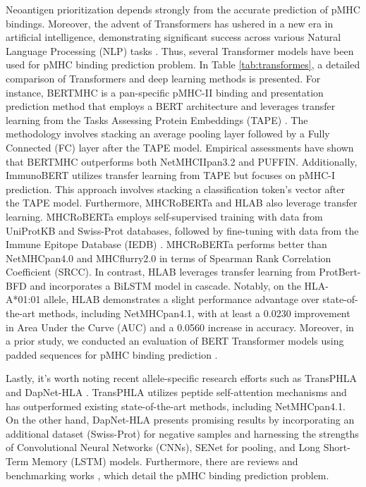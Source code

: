 Neoantigen prioritization depends strongly from the accurate prediction of pMHC bindings. Moreover, the advent of Transformers has ushered in a new era in artificial intelligence, demonstrating significant success across various Natural Language Processing (NLP) tasks \cite{patwardhan2023transformers}. Thus,  several Transformer models have been used for pMHC binding prediction problem. In Table \ref{tab:transformes}, a detailed comparison of Transformers and deep learning methods is presented.  For instance, BERTMHC \cite{cheng2021bertmhc} is a pan-specific pMHC-II binding and presentation prediction method that employs a BERT architecture and leverages transfer learning from the Tasks Assessing Protein Embeddings (TAPE) \cite{rao2019evaluating}. The methodology involves stacking an average pooling layer followed by a Fully Connected (FC) layer after the TAPE model. Empirical assessments have shown that BERTMHC outperforms both NetMHCIIpan3.2 and PUFFIN. Additionally, ImmunoBERT \cite{gasser2021interpreting} utilizes transfer learning from TAPE but focuses on pMHC-I prediction. This approach involves stacking a classification token's vector after the TAPE model.
Furthermore, MHCRoBERTa \cite{wang2022mhcroberta} and HLAB \cite{zhang2022hlab} also leverage transfer learning. MHCRoBERTa employs self-supervised training with data from UniProtKB and Swiss-Prot databases, followed by fine-tuning with data from the Immune Epitope Database (IEDB) \cite{vita2019immune}. MHCRoBERTa performs better than NetMHCpan4.0 and MHCflurry2.0 in terms of Spearman Rank Correlation Coefficient (SRCC). In contrast, HLAB leverages transfer learning from ProtBert-BFD \cite{elnaggar2021prottrans} and incorporates a BiLSTM model in cascade. Notably, on the HLA-A*01:01 allele, HLAB demonstrates a slight performance advantage over state-of-the-art methods, including NetMHCpan4.1, with at least a 0.0230 improvement in Area Under the Curve (AUC) and a 0.0560 increase in accuracy. Moreover, in a prior study, we conducted an evaluation of BERT Transformer models using padded sequences for pMHC binding prediction \cite{arceda2023neoantigen}.

Lastly, it's worth noting recent allele-specific research efforts such as TransPHLA \cite{chu2022transformer} and DapNet-HLA \cite{jing2023dapnet}. TransPHLA utilizes peptide self-attention mechanisms and has outperformed existing state-of-the-art methods, including NetMHCpan4.1. %
On the other hand, DapNet-HLA \cite{jing2023dapnet} presents promising results by incorporating an additional dataset (Swiss-Prot) for negative samples and harnessing the strengths of Convolutional Neural Networks (CNNs), SENet for pooling, and Long Short-Term Memory (LSTM) models. %
Furthermore, there are reviews and benchmarking works \cite{nielsen2020immunoinformatics,mei2020comprehensive,wang2023comprehensive, machaca2023deep,wang2023comprehensive}, which detail the pMHC binding prediction problem. 

